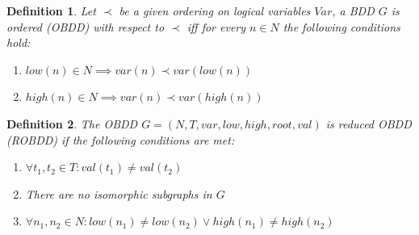 \documentclass[pdflatex,sn-mathphys-num]{sn-jnl}%
\theoremstyle{thmstyleone}%
\theoremstyle{thmstyletwo}%
\theoremstyle{thmstylethree}%
\newtheorem{definition}{Definition}%
\begin{document}
        \vspace*{0.5em}

        \begin{definition}
            Let $\prec$ be a given ordering on logical variables $Var$, a BDD $G$ is ordered (OBDD) with respect to $\prec$ iff for every $n \in N$ the following conditions hold:
            \begin{enumerate}[noindent]
                \item $low(n) \in N \implies var(n) \prec var(low(n))$
                \item $high(n) \in N \implies var(n) \prec var(high(n))$
            \end{enumerate}
        \end{definition}

        \begin{definition}
            The OBDD $G = (N, T, var, low, high, root, val)$ is reduced OBDD (ROBDD) if the following conditions are met:
            \begin{enumerate}[noindent]
                \item $\forall t_1, t_2 \in T : val(t_1) \neq val(t_2)$
                \item There are no isomorphic subgraphs in $G$
                \item $\forall n_1, n_2 \in N : low(n_1) \neq low(n_2) \lor high(n_1) \neq high(n_2)$
            \end{enumerate}
        \end{definition}
\end{document}
